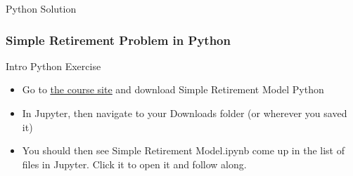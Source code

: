 \documentclass[handout, 11pt]{beamer}
\begin{document}
\begin{section}{Python Solution}
\begin{frame}
\frametitle{Simple Retirement Problem in Python}
{
\begin{block}{Intro Python Exercise}
\begin{itemize}
\item Go to
\textcolor{blue}{\underline{\href{https://nickderobertis.github.io/fin-model-course/}{the course site}}}
and download Simple Retirement Model Python
\item In Jupyter, then navigate to your Downloads folder (or wherever you saved it)
\item You should then see Simple Retirement Model.ipynb come up in the list of files in Jupyter. Click it to open it and follow along.
\end{itemize}
\end{block}
}
\end{frame}
\end{section}
\end{document}
